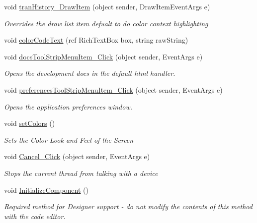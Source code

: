 \begin{DoxyCompactItemize}
void \mbox{\hyperlink{class_cert_complete_1_1_cert_complete_a82a50e75ef8803ad3b7e9cefe953b85e}{tran\+History\+\_\+\+Draw\+Item}} (object sender, Draw\+Item\+Event\+Args e)
\begin{DoxyCompactList}\small\item\em Overrides the draw list item defualt to do color context highlighting \end{DoxyCompactList}\item 
void \mbox{\hyperlink{class_cert_complete_1_1_cert_complete_a494e48d4d48ad64b6295e6079739d816}{color\+Code\+Text}} (ref Rich\+Text\+Box box, string raw\+String)
\item 
void \mbox{\hyperlink{class_cert_complete_1_1_cert_complete_ad4e5d3e29abb99e435da02d9a7416f45}{docs\+Tool\+Strip\+Menu\+Item\+\_\+\+Click}} (object sender, Event\+Args e)
\begin{DoxyCompactList}\small\item\em Opens the development docs in the default html handler. \end{DoxyCompactList}\item 
void \mbox{\hyperlink{class_cert_complete_1_1_cert_complete_a86dc2e3426fdc2c94543671d511eaecb}{preferences\+Tool\+Strip\+Menu\+Item\+\_\+\+Click}} (object sender, Event\+Args e)
\begin{DoxyCompactList}\small\item\em Opens the application preferences window. \end{DoxyCompactList}\item 
void \mbox{\hyperlink{class_cert_complete_1_1_cert_complete_af368ca0602e04e35583426ffe31b2807}{set\+Colors}} ()
\begin{DoxyCompactList}\small\item\em Sets the Color Look and Feel of the Screen \end{DoxyCompactList}\item 
void \mbox{\hyperlink{class_cert_complete_1_1_cert_complete_ab58d18e2c6b7ee27e5bec914d303fca0}{Cancel\+\_\+\+Click}} (object sender, Event\+Args e)
\begin{DoxyCompactList}\small\item\em Stops the current thread from talking with a device \end{DoxyCompactList}\item 
void \mbox{\hyperlink{class_cert_complete_1_1_cert_complete_accf52b3ddec796d4a4a19bddf50813b2}{Initialize\+Component}} ()
\begin{DoxyCompactList}\small\item\em Required method for Designer support -\/ do not modify the contents of this method with the code editor. \end{DoxyCompactList}\end{DoxyCompactItemize}

